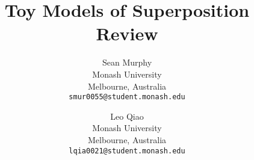\documentclass[10pt,twocolumn,letterpaper]{article}
\title{Toy Models of Superposition Review}
\author{Sean Murphy\\
Monash University\\
Melbourne, Australia\\
{\tt\small smur0055@student.monash.edu}
\and
Leo Qiao\\
Monash University\\
Melbourne, Australia\\
{\tt\small lqia0021@student.monash.edu}
}
\begin{document}
\maketitle


{
	\small
	
	
}

% 
\end{document}
